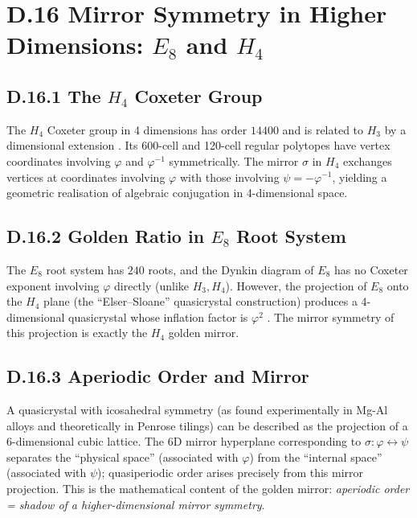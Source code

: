 \section*{D.16  Mirror Symmetry in Higher Dimensions: $E_8$ and $H_4$}

\subsection*{D.16.1  The $H_4$ Coxeter Group}

The $H_4$ Coxeter group in 4 dimensions has order $14400$ and is related to
$H_3$ by a dimensional extension \cite{coxeter_regular_polytopes}.
Its 600-cell and 120-cell regular polytopes have vertex coordinates involving
$\varphi$ and $\varphi^{-1}$ symmetrically.
The mirror $\sigma$ in $H_4$ exchanges vertices at coordinates involving $\varphi$
with those involving $\psi = -\varphi^{-1}$, yielding a geometric realisation of
algebraic conjugation in 4-dimensional space.

\subsection*{D.16.2  Golden Ratio in $E_8$ Root System}

The $E_8$ root system has $240$ roots, and the Dynkin diagram of $E_8$ has no
Coxeter exponent involving $\varphi$ directly (unlike $H_3, H_4$).  However, the
projection of $E_8$ onto the $H_4$ plane (the ``Elser–Sloane'' quasicrystal
construction) produces a 4-dimensional quasicrystal whose inflation factor is
$\varphi^2$ \cite{coxeter_regular_polytopes}.  The mirror symmetry of this
projection is exactly the $H_4$ golden mirror.

\subsection*{D.16.3  Aperiodic Order and Mirror}

A quasicrystal with icosahedral symmetry (as found experimentally in
Mg-Al alloys and theoretically in Penrose tilings) can be described as the
projection of a 6-dimensional cubic lattice.  The 6D mirror hyperplane
corresponding to $\sigma: \varphi\leftrightarrow\psi$ separates the ``physical space''
(associated with $\varphi$) from the ``internal space'' (associated with $\psi$);
quasiperiodic order arises precisely from this mirror projection.
This is the mathematical content of the golden mirror:
\emph{aperiodic order = shadow of a higher-dimensional mirror symmetry}.


